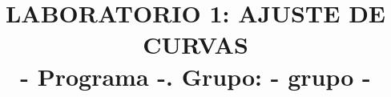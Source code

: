 \documentclass[12pt, a4paper]{article}
\title{\vspace{0cm} \fontsize{14}{14}\selectfont 
\textbf{LABORATORIO 1: }
\textbf{AJUSTE DE CURVAS}\\
\vspace{2mm}
\textbf{ {{- Programa -}}. }
\textbf{Grupo: }{{- grupo -}}
}
\author{
\date{}
\begin{document}
\maketitle
%
\vspace{2mm}
\section{Metodología}
{{- metodologia -}}

\section{Resultados}
\begin{figure}[ht]
\centering
\texttt{[image:  \{\{- grafplot -]}} }
\end{figure}

\section{Conclusiones}
{{- conclusiones -}}

\section{Referencias}
\end{document}
